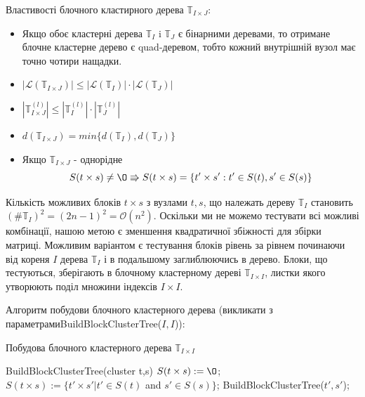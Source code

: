 \documentclass[12pt]{report}
\begin{document}
	\par Властивості блочного кластирного дерева $\mathbb{T}_{I\times J}$:
	\begin{itemize}
		\item Якщо обоє кластерні дерева $\mathbb{T}_I$ i  $\mathbb{T}_J$ є бінарними деревами, то отримане блочне кластерне дерево є quad-деревом, тобто кожний внутрішній вузол має точно чотири нащадки.
		\item $|\mathcal{L}(\mathbb{T}_{I\times J})|\le |\mathcal{L}(\mathbb{T}_I)|\cdot |\mathcal{L}(\mathbb{T}_J)|$
		\item $|\mathbb{T}_{I\times J}^{(l)}|\le |\mathbb{T}_I^{(l)}|\cdot |\mathbb{T}_J^{(l)}|$
		\item $d(\mathbb{T}_{I\times J})=min\{d(\mathbb{T}_I),d(\mathbb{T}_J)\}$
		\item Якщо $\mathbb{T}_{I\times J}$ - однорідне 
		$$S(t\times s) \not=\O\Rrightarrow S(t\times s) =\{t'\times s' : t' \in S(t),s' \in S(s)\} $$
	\end{itemize}
	
	\par Кількість можливих блоків $t\times s$ з вузлами $t,s$, що належать дереву $\mathbb{T}_I$ становить $(\#\mathbb{T}_I)^2=(2n-1)^2=\mathcal{O}(n^2)$. Оскільки ми не можемо тестувати всі можливі комбінації, нашою метою є зменшення квадратичної збіжності для збірки матриці. Можливим варіантом є тестування блоків рівень за рівнем починаючи від кореня $I$ дерева $\mathbb{T}_I$ і в подальшому заглиблюючись в дерево. Блоки, що тестуються, зберігають в блочному кластерному дереві $\mathbb{T}_{I\times I}$, листки якого утворюють поділ множини індексів $I\times I$. \par Алгоритм побудови блочного кластерного дерева (викликати з параметрами\newline BuildBlockClusterTree($I,I$)):
	\begin{algorithm}
	\caption{Побудова блочного кластерного дерева $\mathbb{T}_{I\times I}$}
	\begin{algorithmic}
	 BuildBlockClusterTree(cluster t,s)
	\STATE $S(t\times s):=\O$;
	\ELSE
	\STATE $S(t\times s):=\{t'\times s'|t'\in S(t)$ and $s'\in S(s)\}$;
	\STATE BuildBlockClusterTree($t',s'$);
	\ENDFOR
	\ENDIF
	\end{algorithmic}

	\end{algorithm}
	\newpage
\end{document}
